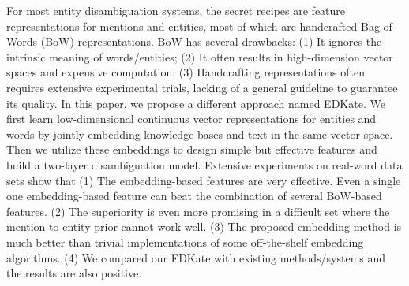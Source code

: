 For most entity disambiguation systems, the secret recipes are feature representations for mentions and entities, most of which are handcrafted Bag-of-Words (BoW) representations. BoW has several drawbacks: (1) It ignores the intrinsic meaning of words/entities; (2) It often results in high-dimension vector spaces and expensive computation; (3) Handcrafting representations often requires extensive experimental trials, lacking of a general guideline to guarantee its quality. In this paper, we propose a different approach named EDKate. We first learn low-dimensional continuous vector representations for entities and words by jointly embedding knowledge bases and text in the same vector space. Then we utilize these embeddings to design simple but effective features and build a two-layer disambiguation model. Extensive experiments on real-word data sets show that (1) The embedding-based features are very effective. Even a single one embedding-based feature can beat the combination of several BoW-based features. (2) The superiority is even more promising in a difficult set where the mention-to-entity prior cannot work well. (3) The proposed embedding method is much better than trivial implementations of some off-the-shelf embedding algorithms. (4) We compared our EDKate with existing methods/systems and the results are also positive.
